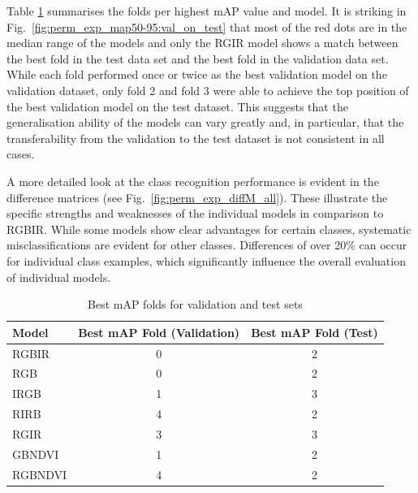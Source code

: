 Table \ref{tab:best_map_fold_perm_exp} summarises the folds per highest \acrshort{mAP} value and model. It is striking in Fig.~\ref{fig:perm_exp_map50-95:val_on_test} that most of the red dots are in the median range of the models and only the \acrshort{RGIR} model shows a match between the best fold in the test data set and the best fold in the validation data set.  While each fold performed once or twice as the best validation model on the validation dataset, only fold 2 and fold 3 were able to achieve the top position of the best validation model on the test dataset. This suggests that the generalisation ability of the models can vary greatly and, in particular, that the transferability from the validation to the test dataset is not consistent in all cases.  

A more detailed look at the class recognition performance is evident in the difference matrices (see Fig.~\ref{fig:perm_exp_diffM_all}). These illustrate the specific strengths and weaknesses of the individual models in comparison to \acrshort{RGBIR}. While some models show clear advantages for certain classes, systematic misclassifications are evident for other classes. Differences of over 20\% can occur for individual class examples, which significantly influence the overall evaluation of individual models.
  






\begin{table}[h!]
\centering

\begin{tabular}{lcc}
\hline
\textbf{Model} & \textbf{Best mAP Fold (Validation)} & \textbf{Best mAP Fold (Test)} \\ \hline
\acrshort{RGBIR}    & 0 & 2 \\
\acrshort{RGB}      & 0 & 2 \\
\acrshort{IRGB}     & 1 & 3 \\
\acrshort{RIRB}     & 4 & 2 \\
\acrshort{RGIR}     & 3 & 3 \\
\acrshort{GBNDVI}   & 1 & 2 \\
\acrshort{RGBNDVI}  & 4 & 2 \\ \hline
\end{tabular}
\caption{Best mAP folds for validation and test sets}
\label{tab:best_map_fold_perm_exp}
\end{table}




